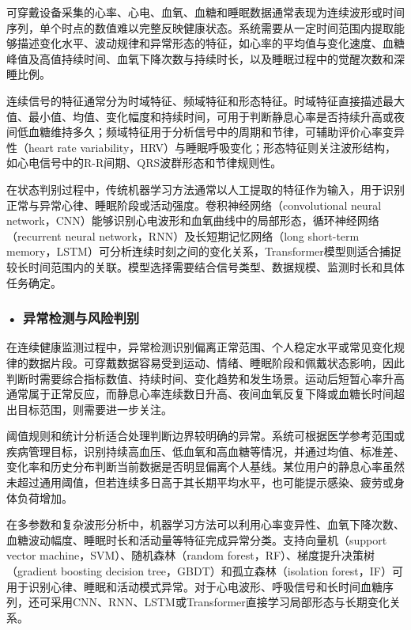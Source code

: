 可穿戴设备采集的心率、心电、血氧、血糖和睡眠数据通常表现为连续波形或时间序列，单个时点的数值难以完整反映健康状态。系统需要从一定时间范围内提取能够描述变化水平、波动规律和异常形态的特征，如心率的平均值与变化速度、血糖峰值及高值持续时间、血氧下降次数与持续时长，以及睡眠过程中的觉醒次数和深睡比例。

连续信号的特征通常分为时域特征、频域特征和形态特征。时域特征直接描述最大值、最小值、均值、变化幅度和持续时间，可用于判断静息心率是否持续升高或夜间低血糖维持多久；频域特征用于分析信号中的周期和节律，可辅助评价心率变异性（heart rate variability，HRV）与睡眠呼吸变化；形态特征则关注波形结构，如心电信号中的R-R间期、QRS波群形态和节律规则性。

在状态判别过程中，传统机器学习方法通常以人工提取的特征作为输入，用于识别正常与异常心律、睡眠阶段或活动强度。卷积神经网络（convolutional neural network，CNN）能够识别心电波形和血氧曲线中的局部形态，循环神经网络（recurrent neural network，RNN）及长短期记忆网络（long short-term memory，LSTM）可分析连续时刻之间的变化关系，Transformer模型则适合捕捉较长时间范围内的关联。模型选择需要结合信号类型、数据规模、监测时长和具体任务确定。


\subsubsection*{\textbf{• 异常检测与风险判别}}

在连续健康监测过程中，异常检测识别偏离正常范围、个人稳定水平或常见变化规律的数据片段。可穿戴数据容易受到运动、情绪、睡眠阶段和佩戴状态影响，因此判断时需要综合指标数值、持续时间、变化趋势和发生场景。运动后短暂心率升高通常属于正常反应，而静息心率连续数日升高、夜间血氧反复下降或血糖长时间超出目标范围，则需要进一步关注。

阈值规则和统计分析适合处理判断边界较明确的异常。系统可根据医学参考范围或疾病管理目标，识别持续高血压、低血氧和高血糖等情况，并通过均值、标准差、变化率和历史分布判断当前数据是否明显偏离个人基线。某位用户的静息心率虽然未超过通用阈值，但若连续多日高于其长期平均水平，也可能提示感染、疲劳或身体负荷增加。

在多参数和复杂波形分析中，机器学习方法可以利用心率变异性、血氧下降次数、血糖波动幅度、睡眠时长和活动量等特征完成异常分类。支持向量机（support vector machine，SVM）、随机森林（random forest，RF）、梯度提升决策树（gradient boosting decision tree，GBDT）和孤立森林（isolation forest，IF）可用于识别心律、睡眠和活动模式异常。对于心电波形、呼吸信号和长时间血糖序列，还可采用CNN、RNN、LSTM或Transformer直接学习局部形态与长期变化关系。

